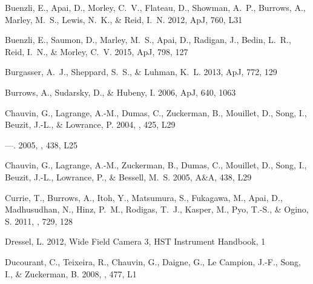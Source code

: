 \documentclass[apj]{emulateapj}
\begin{document}
\begin{thebibliography}{52}
Buenzli, E., Apai, D., Morley, C.~V., Flateau, D., Showman, A.~P., Burrows, A.,
  Marley, M.~S., Lewis, N.~K., \& Reid, I.~N. 2012, ApJ, 760, L31

Buenzli, E., Saumon, D., Marley, M.~S., Apai, D., Radigan, J., Bedin, L.~R.,
  Reid, I.~N., \& Morley, C.~V. 2015, ApJ, 798, 127

{Burgasser}, A.~J., {Sheppard}, S.~S., \& {Luhman}, K.~L. 2013, ApJ, 772, 129

Burrows, A., Sudarsky, D., \& Hubeny, I. 2006, ApJ, 640, 1063

{Chauvin}, G., {Lagrange}, A.-M., {Dumas}, C., {Zuckerman}, B., {Mouillet}, D.,
  {Song}, I., {Beuzit}, J.-L., \& {Lowrance}, P. 2004, \aap, 425, L29

---. 2005, \aap, 438, L25

Chauvin, G., Lagrange, A.-M., Zuckerman, B., Dumas, C., Mouillet, D., Song, I.,
  Beuzit, J.-L., Lowrance, P., \& Bessell, M.~S. 2005, A{\&}A, 438, L29

{Currie}, T., {Burrows}, A., {Itoh}, Y., {Matsumura}, S., {Fukagawa}, M.,
  {Apai}, D., {Madhusudhan}, N., {Hinz}, P.~M., {Rodigas}, T.~J., {Kasper}, M.,
  {Pyo}, T.-S., \& {Ogino}, S. 2011, \apj, 729, 128

Dressel, L. 2012, Wide Field Camera 3, HST Instrument Handbook, 1

{Ducourant}, C., {Teixeira}, R., {Chauvin}, G., {Daigne}, G., {Le Campion},
  J.-F., {Song}, I., \& {Zuckerman}, B. 2008, \aap, 477, L1


\end{thebibliography}
\end{document}
